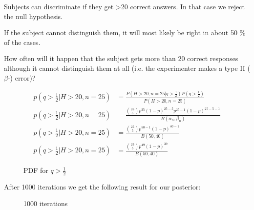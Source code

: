 Subjects can discriminate if they get >20 correct answers. In that case we reject the null hypothesis.

\bigskip

If the subject cannot distinguish them, it will most likely be right in about 50 \% of the cases.

How often will it happen that the subject gets more than 20 correct responses although it cannot distinguish them at all (i.e. the experimenter makes a type II ($\beta$-) error)?

\begin{align*}
p(q>\frac{1}{2}|H>20,n=25) &= \frac{P(H>20,n=25|q>\frac{1}{2})P(q>\frac{1}{2})}{P(H>20,n=25)} \\
p(q>\frac{1}{2}|H>20,n=25) &= \frac{ \binom{25}{5} p^{25}(1-p)^{25-5}p^{25-1}(1-p)^{25-5-1}}{B(\alpha_n,\beta_n)} \\
p(q>\frac{1}{2}|H>20,n=25) &= \frac{ \binom{25}{5} p^{50-1}(1-p)^{40-1}}{B(50,40)} \\
p(q>\frac{1}{2}|H>20,n=25) &= \frac{ \binom{25}{5} p^{49}(1-p)^{39}}{B(50,40)}
\end{align*}

\begin{figure}[!ht]
\centering
{}
\caption{PDF for $q>\frac{1}{2}$}
\label{fig:2014-05-30_ex4pdf}
\end{figure}

After 1000 iterations we get the following result for our posterior:
\begin{figure}[!ht]
\centering
{}
\caption{1000 iterations}
\label{fig:2014-05-30_ex4pdfsim}
\end{figure}


